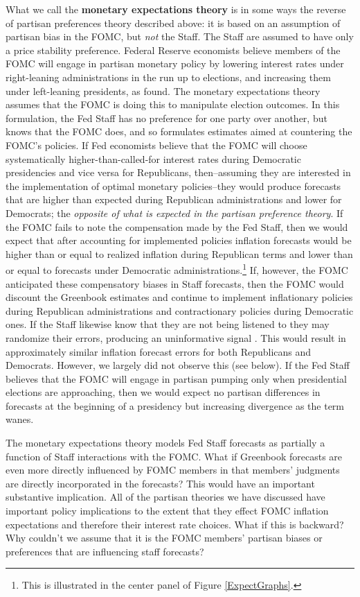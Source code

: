 \documentclass[a4paper]{article}
\begin{document}
What we call the {\bf{monetary expectations theory}} is in some ways the reverse of partisan preferences theory described above: it is based on an assumption of partisan bias in the FOMC, but {\emph{not}} the Staff. The Staff are assumed to have only a price stability preference. Federal Reserve economists believe members of the FOMC will engage in partisan monetary policy by lowering interest rates under right-leaning administrations in the run up to elections, and increasing them under left-leaning presidents, as \cite{Clark2012} found. The monetary expectations theory assumes that the FOMC is doing this to manipulate election outcomes. In this formulation, the Fed Staff has no preference for one party over another, but knows that the FOMC does, and so formulates estimates aimed at countering the FOMC's policies. If Fed economists believe that the FOMC will choose systematically higher-than-called-for interest rates during Democratic presidencies and vice versa for Republicans, then--assuming they are interested in the implementation of optimal monetary policies--they would produce forecasts that are higher than expected during Republican administrations and lower for Democrats; the {\emph{opposite of what is expected in the partisan preference theory}}. If the FOMC fails to note the compensation made by the Fed Staff, then we would expect that after accounting for implemented policies inflation forecasts would be higher than or equal to realized inflation during Republican terms and lower than or equal to forecasts under Democratic administrations.\footnote{This is illustrated in the center panel of Figure \ref{ExpectGraphs}.} If, however, the FOMC anticipated these compensatory biases in Staff forecasts, then the FOMC would discount the Greenbook estimates and continue to implement inflationary policies during Republican administrations and contractionary policies during Democratic ones. If the Staff likewise know that they are not being listened to they may randomize their errors, producing an uninformative signal \citep{Crawford1982}. This would result in approximately similar inflation forecast errors for both Republicans and Democrats. However, we largely did not observe this (see below). If the Fed Staff believes that the FOMC will engage in partisan pumping only when presidential elections are approaching, then we would expect no partisan differences in forecasts at the beginning of a presidency but increasing divergence as the term wanes.

The monetary expectations theory models Fed Staff forecasts as partially a function of Staff interactions with the FOMC. What if Greenbook forecasts are even more directly influenced by FOMC members in that members' judgments are directly incorporated in the forecasts? This would have an important substantive implication. All of the partisan theories we have discussed have important policy implications to the extent that they effect FOMC inflation expectations and therefore their interest rate choices. What if this is backward? Why couldn't we assume that it is the FOMC members' partisan biases or preferences that are influencing staff forecasts? 
\end{document}
